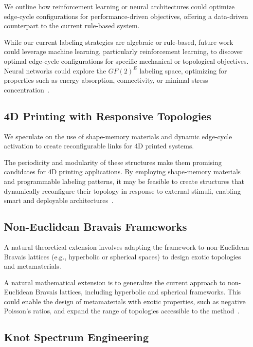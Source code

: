 \documentclass[times,twocolumn,final]{elsarticle}
\begin{document}
We outline how reinforcement learning or neural architectures could optimize edge-cycle configurations for performance-driven objectives, offering a data-driven counterpart to the current rule-based system.

While our current labeling strategies are algebraic or rule-based, future work could leverage machine learning, particularly reinforcement learning, to discover optimal edge-cycle configurations for specific mechanical or topological objectives. Neural networks could explore the $GF(2)^E$ labeling space, optimizing for properties such as energy absorption, connectivity, or minimal stress concentration~\cite{zhang2025recognizing}.

\subsection{4D Printing with Responsive Topologies}

We speculate on the use of shape-memory materials and dynamic edge-cycle activation to create reconfigurable links for 4D printed systems.

The periodicity and modularity of these structures make them promising candidates for 4D printing applications. By employing shape-memory materials and programmable labeling patterns, it may be feasible to create structures that dynamically reconfigure their topology in response to external stimuli, enabling smart and deployable architectures~\cite{tang2023chainmail}.

\subsection{Non-Euclidean Bravais Frameworks}

A natural theoretical extension involves adapting the framework to non-Euclidean Bravais lattices (e.g., hyperbolic or spherical spaces) to design exotic topologies and metamaterials.

A natural mathematical extension is to generalize the current approach to non-Euclidean Bravais lattices, including hyperbolic and spherical frameworks. This could enable the design of metamaterials with exotic properties, such as negative Poisson's ratios, and expand the range of topologies accessible to the method~\cite{chen2025sympdesign}.

\subsection{Knot Spectrum Engineering}
\end{document}
